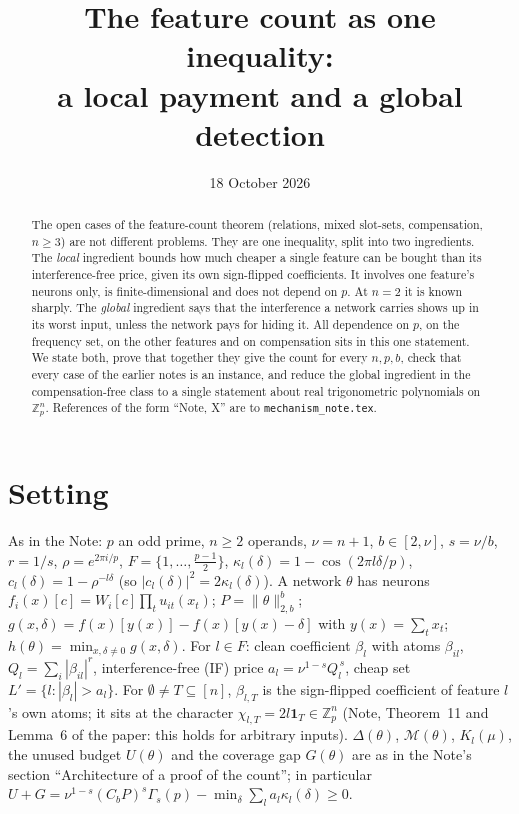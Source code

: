 \documentclass[11pt]{article}
\title{The feature count as one inequality:\\ a local payment and a global detection}
\author{}
\date{18 October 2026}
\theoremstyle{definition}
\begin{document}
\maketitle

\begin{abstract}
The open cases of the feature-count theorem (relations, mixed slot-sets, compensation, $n\ge3$) are not different
problems.  They are one inequality, split into two ingredients.  The \emph{local} ingredient bounds how much cheaper a single
feature can be bought than its interference-free price, given its own sign-flipped coefficients.  It involves one feature's
neurons only, is finite-dimensional and does not depend on $p$.  At $n=2$ it is known sharply.  The \emph{global} ingredient
says that the interference a network carries shows up in its worst input, unless the network pays for hiding it.  All dependence
on $p$, on the frequency set, on the other features and on compensation sits in this one statement.  We state both, prove that
together they give the count for every $n,p,b$, check that every case of the earlier notes is an instance, and reduce the global
ingredient in the compensation-free class to a single statement about real trigonometric polynomials on $\mathbb Z_p^n$.  References
of the form ``Note, X'' are to \texttt{mechanism\_note.tex}.
\end{abstract}

\section{Setting}
As in the Note: $p$ an odd prime, $n\ge2$ operands, $\nu=n+1$, $b\in[2,\nu]$, $s=\nu/b$, $r=1/s$, $\rho=e^{2\pi i/p}$,
$F=\{1,\dots,\frac{p-1}2\}$, $\kappa_l(\delta)=1-\cos(2\pi l\delta/p)$, $c_l(\delta)=1-\rho^{-l\delta}$ (so $|c_l(\delta)|^2=2\kappa_l(\delta)$).
A network $\theta$ has neurons $f_i(x)[c]=W_i[c]\prod_tu_{it}(x_t)$; $P=\|\theta\|_{2,b}^b$; $g(x,\delta)=f(x)[y(x)]-f(x)[y(x)-\delta]$ with
$y(x)=\sum_tx_t$; $h(\theta)=\min_{x,\delta\ne0}g(x,\delta)$.  For $l\in F$: clean coefficient $\beta_l$ with atoms $\beta_{il}$,
$Q_l=\sum_i|\beta_{il}|^r$, interference-free (IF) price $a_l=\nu^{1-s}Q_l^{\,s}$, cheap set $L'=\{l:|\beta_l|>a_l\}$.  For $\emptyset\ne T\subseteq[n]$,
$\beta_{l,T}$ is the sign-flipped coefficient of feature $l$'s own atoms; it sits at the character $\chi_{l,T}=2l\mathbf 1_T\in\mathbb Z_p^n$
(Note, Theorem~11 and Lemma~6 of the paper: this holds for arbitrary inputs).  $\Delta(\theta)$, $\mathcal M(\theta)$, $K_l(\mu)$, the unused
budget $U(\theta)$ and the coverage gap $G(\theta)$ are as in the Note's section ``Architecture of a proof of the count''; in
particular $U+G=\nu^{1-s}(C_bP)^s\Gamma_s(p)-\min_\delta\sum_la_l\kappa_l(\delta)\ge0$.
\end{document}
